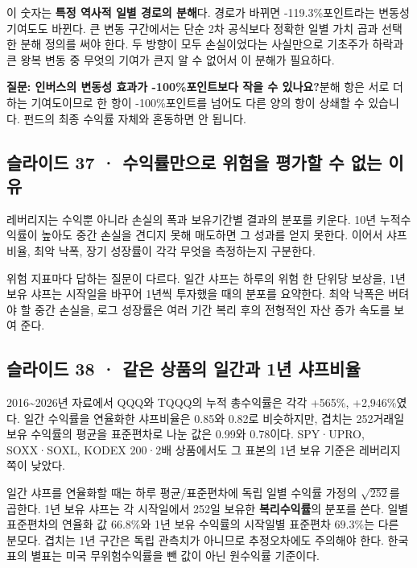 \documentclass[11pt,a4paper]{article}
\begin{document}
이 숫자는 \textbf{특정 역사적 일별 경로의 분해}다. 경로가 바뀌면 -119.3\%포인트라는 변동성 기여도도 바뀐다. 큰 변동 구간에서는 단순 2차 공식보다 정확한 일별 가치 곱과 선택한 분해 정의를 써야 한다. 두 방향이 모두 손실이었다는 사실만으로 기초주가 하락과 큰 왕복 변동 중 무엇의 기여가 큰지 알 수 없어서 이 분해가 필요하다.\par

\begin{samepage}\par\medskip\noindent\textbf{질문: 인버스의 변동성 효과가 -100\%포인트보다 작을 수 있나요?}\quad 분해 항은 서로 더하는 기여도이므로 한 항이 -100\%포인트를 넘어도 다른 양의 항이 상쇄할 수 있습니다. 펀드의 최종 수익률 자체와 혼동하면 안 됩니다.\par\end{samepage}

\subsection{슬라이드 37 · 수익률만으로 위험을 평가할 수 없는 이유}
레버리지는 수익뿐 아니라 손실의 폭과 보유기간별 결과의 분포를 키운다. 10년 누적수익률이 높아도 중간 손실을 견디지 못해 매도하면 그 성과를 얻지 못한다. 이어서 샤프비율, 최악 낙폭, 장기 성장률이 각각 무엇을 측정하는지 구분한다.\par

위험 지표마다 답하는 질문이 다르다. 일간 샤프는 하루의 위험 한 단위당 보상을, 1년 보유 샤프는 시작일을 바꾸어 1년씩 투자했을 때의 분포를 요약한다. 최악 낙폭은 버텨야 할 중간 손실을, 로그 성장률은 여러 기간 복리 후의 전형적인 자산 증가 속도를 보여 준다.\par

\subsection{슬라이드 38 · 같은 상품의 일간과 1년 샤프비율}
2016\~{}2026년 자료에서 QQQ와 TQQQ의 누적 총수익률은 각각 +565\%, +2,946\%였다. 일간 수익률을 연율화한 샤프비율은 0.85와 0.82로 비슷하지만, 겹치는 252거래일 보유 수익률의 평균을 표준편차로 나눈 값은 0.99와 0.78이다. SPY·UPRO, SOXX·SOXL, KODEX 200·2배 상품에서도 그 표본의 1년 보유 기준은 레버리지 쪽이 낮았다.\par

일간 샤프를 연율화할 때는 하루 평균/표준편차에 독립 일별 수익률 가정의 $\sqrt{252}$를 곱한다. 1년 보유 샤프는 각 시작일에서 252일 보유한 \textbf{복리수익률}의 분포를 쓴다. 일별 표준편차의 연율화 값 $66.8\%$와 1년 보유 수익률의 시작일별 표준편차 $69.3\%$는 다른 분모다. 겹치는 1년 구간은 독립 관측치가 아니므로 추정오차에도 주의해야 한다. 한국 표의 별표는 미국 무위험수익률을 뺀 값이 아닌 원수익률 기준이다.\par
\end{document}
